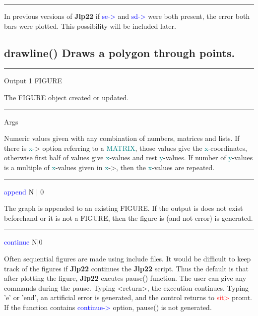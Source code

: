 \vspace{-7mm} \rule{5cm}{0.1pt} 
\onehalfspacing 
\begin{note} 
In previous versions of \textbf{Jlp22} if \textcolor{blue}{se->} and \textcolor{blue}{sd->} were both present, the error 
both bars were plotted. This possibility will be included later. 
\end{note} 
\subsection{\textcolor{VioletRed}{drawline}() Draws a polygon through points.} 
\label{drawline} 
\vspace{0.3cm} 
\hrule 
\vspace{0.3cm} 
\noindent Output  \tabto{3cm}  1 \tabto{5cm}   FIGURE  \tabto{7cm} 
\begin{changemargin}{3cm}{0cm} 
\noindent  The FIGURE object created or updated. 
\end{changemargin} 
\vspace{0.3cm} 
\hrule 
\vspace{0.3cm} 
\noindent Args \tabto{3cm}  \tabto{5cm}    \tabto{7cm} 
\begin{changemargin}{3cm}{0cm} 
\noindent Numeric values given with any combination of numbers, matrices and lists. If there is 
\textcolor{teal}{x}-> option referring to a \textcolor{teal}{MATRIX}, those values give the \textcolor{teal}{x}-coordinates, otherwise 
first half of values give \textcolor{teal}{x}-values and rest \textcolor{teal}{y}-values. If number of \textcolor{teal}{y}-values is a multiple 
of \textcolor{teal}{x}-values given in \textcolor{teal}{x}->, then the \textcolor{teal}{x}-values are repeated. 
 
\end{changemargin} 
\vspace{0.3cm} 
\hrule 
\vspace{0.3cm} 
\noindent \textcolor{blue}{append} \tabto{3cm} N | 0  \tabto{5cm}    \tabto{7cm} 
\begin{changemargin}{3cm}{0cm} 
\noindent  The graph is appended to an existing FIGURE. If the output is does not exist 
beforehand or it is not a FIGURE, then the figure is (and not error) is generated. 
\end{changemargin} 
\vspace{0.3cm} 
\hrule 
\vspace{0.3cm} 
\noindent \textcolor{blue}{continue} \tabto{3cm} N|0  \tabto{5cm}    \tabto{7cm} 
\begin{changemargin}{3cm}{0cm} 
\noindent  Often sequential figures are made using include files. It would be difficult 
to keep track of the figures if \textbf{Jlp22} continues the \textbf{Jlp22} script. Thus the default is that 
after plotting the figure, \textbf{Jlp22} excutes \textcolor{VioletRed}{pause}() function. The user can 
give any commands during the pause. Typing <return>, the exceution continues. Typing 'e' or 'end', 
an artificial error is generated, and the control returns to \textcolor{Red}{sit>} promt. If the function 
contains \textcolor{blue}{continue->} option, \textcolor{VioletRed}{pause}() is not generated. 
\end{changemargin} 
